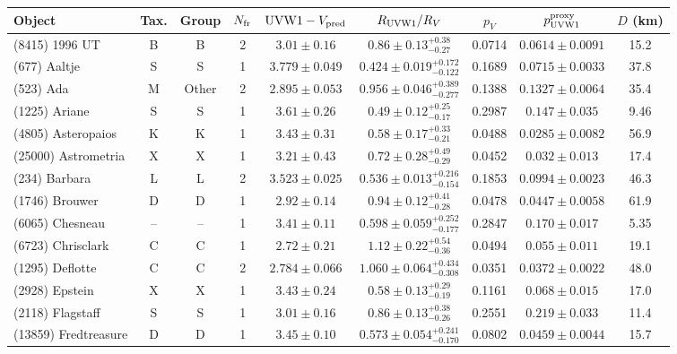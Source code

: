\begin{table}[t]
\centering
\small
\setlength{\tabcolsep}{2.2pt}
\renewcommand{\arraystretch}{1.05}
\begin{tabular}{lcccccccc}
\toprule
Object & Tax. & Group & $N_{\rm fr}$ & $\mathrm{UVW1}-V_{\rm pred}$ & $R_{\rm UVW1}/R_V$ & $p_V$ & $p_{\rm UVW1}^{\rm proxy}$ & $D$ (km) \\
\midrule
(8415) 1996 UT & B & B & 2 & $3.01 \pm 0.16$ & $0.86 \pm 0.13{}_{-0.27}^{+0.38}$ & 0.0714 & $0.0614 \pm 0.0091$ & 15.2 \\
(677) Aaltje & S & S & 1 & $3.779 \pm 0.049$ & $0.424 \pm 0.019{}_{-0.122}^{+0.172}$ & 0.1689 & $0.0715 \pm 0.0033$ & 37.8 \\
(523) Ada & M & Other & 2 & $2.895 \pm 0.053$ & $0.956 \pm 0.046{}_{-0.277}^{+0.389}$ & 0.1388 & $0.1327 \pm 0.0064$ & 35.4 \\
(1225) Ariane & S & S & 1 & $3.61 \pm 0.26$ & $0.49 \pm 0.12{}_{-0.17}^{+0.25}$ & 0.2987 & $0.147 \pm 0.035$ & 9.46 \\
(4805) Asteropaios & K & K & 1 & $3.43 \pm 0.31$ & $0.58 \pm 0.17{}_{-0.21}^{+0.33}$ & 0.0488 & $0.0285 \pm 0.0082$ & 56.9 \\
(25000) Astrometria & X & X & 1 & $3.21 \pm 0.43$ & $0.72 \pm 0.28{}_{-0.29}^{+0.49}$ & 0.0452 & $0.032 \pm 0.013$ & 17.4 \\
(234) Barbara & L & L & 2 & $3.523 \pm 0.025$ & $0.536 \pm 0.013{}_{-0.154}^{+0.216}$ & 0.1853 & $0.0994 \pm 0.0023$ & 46.3 \\
(1746) Brouwer & D & D & 1 & $2.92 \pm 0.14$ & $0.94 \pm 0.12{}_{-0.28}^{+0.41}$ & 0.0478 & $0.0447 \pm 0.0058$ & 61.9 \\
(6065) Chesneau & -- & -- & 1 & $3.41 \pm 0.11$ & $0.598 \pm 0.059{}_{-0.177}^{+0.252}$ & 0.2847 & $0.170 \pm 0.017$ & 5.35 \\
(6723) Chrisclark & C & C & 1 & $2.72 \pm 0.21$ & $1.12 \pm 0.22{}_{-0.36}^{+0.54}$ & 0.0494 & $0.055 \pm 0.011$ & 19.1 \\
(1295) Deflotte & C & C & 2 & $2.784 \pm 0.066$ & $1.060 \pm 0.064{}_{-0.308}^{+0.434}$ & 0.0351 & $0.0372 \pm 0.0022$ & 48.0 \\
(2928) Epstein & X & X & 1 & $3.43 \pm 0.24$ & $0.58 \pm 0.13{}_{-0.19}^{+0.29}$ & 0.1161 & $0.068 \pm 0.015$ & 17.0 \\
(2118) Flagstaff & S & S & 1 & $3.01 \pm 0.16$ & $0.86 \pm 0.13{}_{-0.26}^{+0.38}$ & 0.2551 & $0.219 \pm 0.033$ & 11.4 \\
(13859) Fredtreasure & D & D & 1 & $3.45 \pm 0.10$ & $0.573 \pm 0.054{}_{-0.170}^{+0.241}$ & 0.0802 & $0.0459 \pm 0.0044$ & 15.7 \\

\end{tabular}
\end{table}
